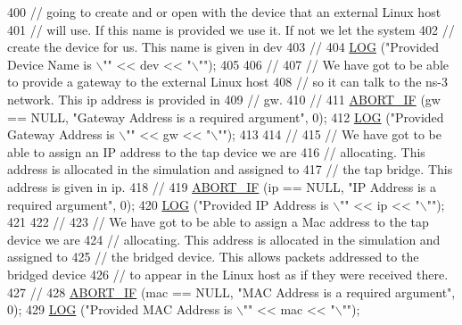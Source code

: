 \begin{DoxyCode}
400   \textcolor{comment}{// going to create and or open with the device that an external Linux host}
401   \textcolor{comment}{// will use.  If this name is provided we use it.  If not we let the system}
402   \textcolor{comment}{// create the device for us.  This name is given in dev}
403   \textcolor{comment}{//}
404   \hyperlink{tap-creator_8cc_a158a8c64f24645c7478298399825737f}{LOG} (\textcolor{stringliteral}{"Provided Device Name is \(\backslash\)""} << dev << \textcolor{stringliteral}{"\(\backslash\)""});
405 
406   \textcolor{comment}{//}
407   \textcolor{comment}{// We have got to be able to provide a gateway to the external Linux host }
408   \textcolor{comment}{// so it can talk to the ns-3 network.  This ip address is provided in }
409   \textcolor{comment}{// gw.}
410   \textcolor{comment}{//}
411   \hyperlink{tap-creator_8cc_a91c11c90ad2f1672fbd3c031038dce16}{ABORT\_IF} (gw == NULL, \textcolor{stringliteral}{"Gateway Address is a required argument"}, 0);
412   \hyperlink{tap-creator_8cc_a158a8c64f24645c7478298399825737f}{LOG} (\textcolor{stringliteral}{"Provided Gateway Address is \(\backslash\)""} << gw << \textcolor{stringliteral}{"\(\backslash\)""});
413 
414   \textcolor{comment}{//}
415   \textcolor{comment}{// We have got to be able to assign an IP address to the tap device we are}
416   \textcolor{comment}{// allocating.  This address is allocated in the simulation and assigned to}
417   \textcolor{comment}{// the tap bridge.  This address is given in ip.}
418   \textcolor{comment}{//}
419   \hyperlink{tap-creator_8cc_a91c11c90ad2f1672fbd3c031038dce16}{ABORT\_IF} (ip == NULL, \textcolor{stringliteral}{"IP Address is a required argument"}, 0);
420   \hyperlink{tap-creator_8cc_a158a8c64f24645c7478298399825737f}{LOG} (\textcolor{stringliteral}{"Provided IP Address is \(\backslash\)""} << ip << \textcolor{stringliteral}{"\(\backslash\)""});
421 
422   \textcolor{comment}{//}
423   \textcolor{comment}{// We have got to be able to assign a Mac address to the tap device we are}
424   \textcolor{comment}{// allocating.  This address is allocated in the simulation and assigned to}
425   \textcolor{comment}{// the bridged device.  This allows packets addressed to the bridged device}
426   \textcolor{comment}{// to appear in the Linux host as if they were received there.}
427   \textcolor{comment}{//}
428   \hyperlink{tap-creator_8cc_a91c11c90ad2f1672fbd3c031038dce16}{ABORT\_IF} (mac == NULL, \textcolor{stringliteral}{"MAC Address is a required argument"}, 0);
429   \hyperlink{tap-creator_8cc_a158a8c64f24645c7478298399825737f}{LOG} (\textcolor{stringliteral}{"Provided MAC Address is \(\backslash\)""} << mac << \textcolor{stringliteral}{"\(\backslash\)""});

\end{DoxyCode}
